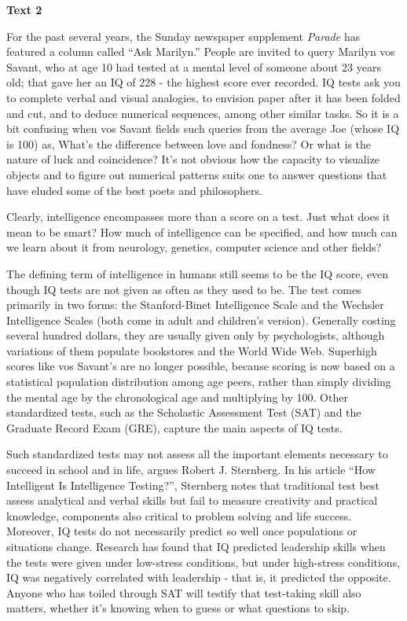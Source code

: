 
\begin{center}\textbf{Text 2}\end{center}

\qquad For the past several years, the Sunday newspaper supplement \emph{Parade} has featured a column called ``Ask Marilyn.'' People are invited to query Marilyn vos Savant, who at age 10 had tested at a mental level of someone about 23 years old; that gave her an IQ of 228 - the highest score ever recorded. IQ tests ask you to complete verbal and visual analogies, to envision paper after it has been folded and cut, and to deduce numerical sequences, among other similar tasks. So it is a bit confusing when vos Savant fields such queries from the average Joe (whose IQ is 100) as, What's the difference between love and fondness? Or what is the nature of luck and coincidence? It's not obvious how the capacity to visualize objects and to figure out numerical patterns suits one to answer questions that have eluded some of the best poets and philosophers.

\qquad Clearly, intelligence encompasses more than a score on a test. Just what does it mean to be smart? How much of intelligence can be specified, and how much can we learn about it from neurology, genetics, computer science and other fields?

\qquad The defining term of intelligence in humans still seems to be the IQ score, even though IQ tests are not given as often as they used to be. The test comes primarily in two forms: the Stanford-Binet Intelligence Scale and the Wechsler Intelligence Scales (both come in adult and children's version). Generally costing several hundred dollars, they are usually given only by psychologists, although variations of them populate bookstores and the World Wide Web. Superhigh scores like vos Savant's are no longer possible, because scoring is now based on a statistical population distribution among age peers, rather than simply dividing the mental age by the chronological age and multiplying by 100.  Other standardized tests, such as the Scholastic Assessment Test (SAT) and the Graduate Record Exam (GRE), capture the main aspects of IQ tests.

\qquad Such standardized tests may not assess all the important elements necessary to succeed in school and in life, argues Robert J. Sternberg. In his article ``How Intelligent Is Intelligence Testing?'', Sternberg notes that traditional test best assess analytical and verbal skills but fail to measure creativity and practical knowledge, components also critical to problem solving and life success. Moreover, IQ tests do not necessarily predict so well once populations or situations change. Research has found that IQ predicted leadership skills when the tests were given under low-stress conditions, but under high-stress conditions, IQ was negatively correlated with leadership - that is, it predicted the opposite. Anyone who has toiled through SAT will testify that test-taking skill also matters, whether it's knowing when to guess or what questions to skip.

